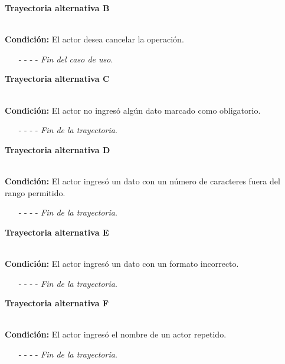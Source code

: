 \hypertarget{CU10-2:TAB}{\textbf{Trayectoria alternativa B}}\\
\noindent \textbf{Condición:} El actor desea cancelar la operación.
\begin{enumerate}
	\UCpaso[\UCactor] Solicita cancelar la operación oprimiendo el botón  de la pantalla .
	\UCpaso[\UCsist] Muestra la pantalla .
	\item[- -] - - {\em {Fin del caso de uso}}.%
\end{enumerate}
\hypertarget{CU10-2:TAC}{\textbf{Trayectoria alternativa C}}\\
\noindent \textbf{Condición:} El actor no ingresó algún dato marcado como obligatorio.
\begin{enumerate}
	\UCpaso[\UCsist] Muestra el mensaje  señalando el campo que presenta el error en la pantalla .
	\UCpaso Regresa al paso \ref{CU10.2-P6} de la trayectoria principal.
	\item[- -] - - {\em {Fin de la trayectoria}}.%
\end{enumerate}
\hypertarget{CU10-2:TAD}{\textbf{Trayectoria alternativa D}}\\
\noindent \textbf{Condición:} El actor ingresó un dato con un número de caracteres fuera del rango permitido.
\begin{enumerate}
	\UCpaso[\UCsist] Muestra el mensaje  señalando el campo que presenta el error en la pantalla .
	\UCpaso Regresa al paso \ref{CU10.2-P6} de la trayectoria principal.
	\item[- -] - - {\em {Fin de la trayectoria}}.%
\end{enumerate}
\hypertarget{CU10-2:TAE}{\textbf{Trayectoria alternativa E}}\\
\noindent \textbf{Condición:} El actor ingresó un dato con un formato incorrecto.
\begin{enumerate}
	\UCpaso[\UCsist] Muestra el mensaje  señalando el campo que presenta el error en la pantalla .
	\UCpaso Regresa al paso \ref{CU10.2-P6} de la trayectoria principal.
	\item[- -] - - {\em {Fin de la trayectoria}}.
\end{enumerate}
\hypertarget{CU10-2:TAF}{\textbf{Trayectoria alternativa F}}\\
\noindent \textbf{Condición:} El actor ingresó el nombre de un actor repetido.
\begin{enumerate}
	\UCpaso[\UCsist] Muestra el mensaje  señalando el campo que presenta la duplicidad en la pantalla .
	\UCpaso Regresa al paso \ref{CU10.2-P6} de la trayectoria principal.
	\item[- -] - - {\em {Fin de la trayectoria}}.
\end{enumerate}